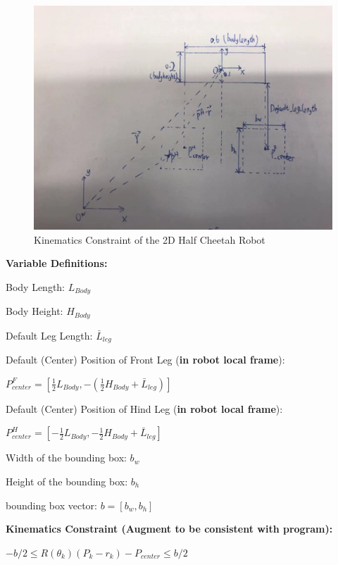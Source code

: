 \documentclass[a4paper,10pt]{article}
\begin{document}
\begin{figure}[h!]
	\centering
	\includegraphics[scale = 0.3]{KinematicsConstraint}
	\caption{Kinematics Constraint of the 2D Half Cheetah Robot}
	\label{fig:kinematics_contraint}
\end{figure}

\textbf{Variable Definitions:}

Body Length: $L_{Body}$

Body Height: $H_{Body}$

Default Leg Length: $\bar{L}_{leg}$

Default (Center) Position of Front Leg (\textbf{in robot local frame}): 

$P^F_{center} = [\frac{1}{2}L_{Body}, -(\frac{1}{2}H_{Body} + \bar{L}_{leg})] $

Default (Center) Position of Hind Leg (\textbf{in robot local frame}): 

$P^H_{center} = [-\frac{1}{2}L_{Body}, -\frac{1}{2}H_{Body} + \bar{L}_{leg}]$

Width of the bounding box: $b_w$

Height of the bounding box: $b_h$

bounding box vector: $b = [b_w, b_h]$

\vspace{3mm}

\textbf{Kinematics Constraint (Augment to be consistent with program):}

$-b/2 \leq R(\theta_k)(P_k-r_k) - P_{center} \leq b/2$

\vspace{3mm}
\end{document}
